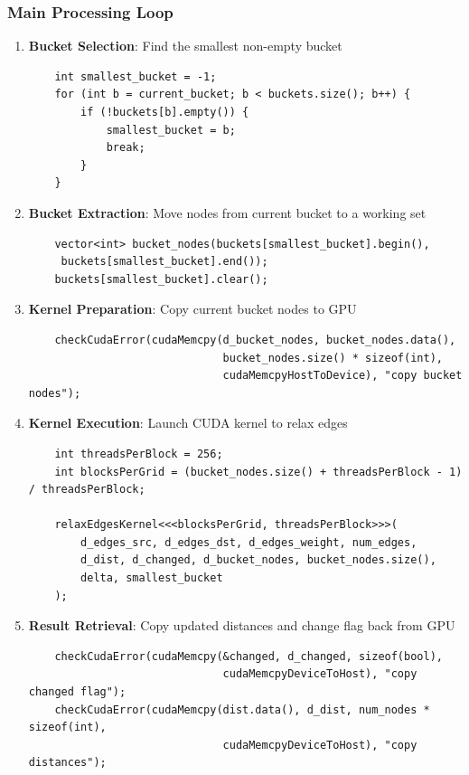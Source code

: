 \documentclass{article}
\begin{document}
\subsubsection*{Main Processing Loop}
\begin{enumerate}
    \item \textbf{Bucket Selection}: Find the smallest non-empty bucket
    \begin{verbatim}
    int smallest_bucket = -1;
    for (int b = current_bucket; b < buckets.size(); b++) {
        if (!buckets[b].empty()) {
            smallest_bucket = b;
            break;
        }
    }
    \end{verbatim}
    
    \item \textbf{Bucket Extraction}: Move nodes from current bucket to a working set
    \begin{verbatim}
    vector<int> bucket_nodes(buckets[smallest_bucket].begin(),
     buckets[smallest_bucket].end());
    buckets[smallest_bucket].clear();
    \end{verbatim}
    
    \item \textbf{Kernel Preparation}: Copy current bucket nodes to GPU
    \begin{verbatim}
    checkCudaError(cudaMemcpy(d_bucket_nodes, bucket_nodes.data(), 
                              bucket_nodes.size() * sizeof(int), 
                              cudaMemcpyHostToDevice), "copy bucket nodes");
    \end{verbatim}
    
    \item \textbf{Kernel Execution}: Launch CUDA kernel to relax edges
    \begin{verbatim}
    int threadsPerBlock = 256;
    int blocksPerGrid = (bucket_nodes.size() + threadsPerBlock - 1) / threadsPerBlock;
    
    relaxEdgesKernel<<<blocksPerGrid, threadsPerBlock>>>(
        d_edges_src, d_edges_dst, d_edges_weight, num_edges,
        d_dist, d_changed, d_bucket_nodes, bucket_nodes.size(),
        delta, smallest_bucket
    );
    \end{verbatim}
    
    \item \textbf{Result Retrieval}: Copy updated distances and change flag back from GPU
    \begin{verbatim}
    checkCudaError(cudaMemcpy(&changed, d_changed, sizeof(bool), 
                              cudaMemcpyDeviceToHost), "copy changed flag");
    checkCudaError(cudaMemcpy(dist.data(), d_dist, num_nodes * sizeof(int), 
                              cudaMemcpyDeviceToHost), "copy distances");
    \end{verbatim}
    

\end{enumerate}
\end{document}
